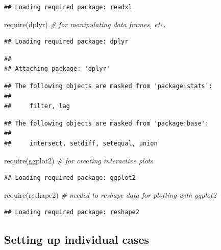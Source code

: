 \documentclass[
]{article}
\newenvironment{Shaded}{\begin{snugshade}}{\end{snugshade}}
\newcommand{\CommentTok}[1]{\textcolor[rgb]{0.56,0.35,0.01}{\textit{#1}}}
\newcommand{\FunctionTok}[1]{\textcolor[rgb]{0.00,0.00,0.00}{#1}}
\newcommand{\NormalTok}[1]{#1}
\begin{document}
\begin{verbatim}
## Loading required package: readxl
\end{verbatim}

\begin{Shaded}
\begin{Highlighting}[]
\FunctionTok{require}\NormalTok{(dplyr)    }\CommentTok{\# for manipulating data frames, etc. }
\end{Highlighting}
\end{Shaded}

\begin{verbatim}
## Loading required package: dplyr
\end{verbatim}

\begin{verbatim}
## 
## Attaching package: 'dplyr'
\end{verbatim}

\begin{verbatim}
## The following objects are masked from 'package:stats':
## 
##     filter, lag
\end{verbatim}

\begin{verbatim}
## The following objects are masked from 'package:base':
## 
##     intersect, setdiff, setequal, union
\end{verbatim}

\begin{Shaded}
\begin{Highlighting}[]
\FunctionTok{require}\NormalTok{(ggplot2)  }\CommentTok{\# for creating interactive plots }
\end{Highlighting}
\end{Shaded}

\begin{verbatim}
## Loading required package: ggplot2
\end{verbatim}

\begin{Shaded}
\begin{Highlighting}[]
\FunctionTok{require}\NormalTok{(reshape2) }\CommentTok{\# needed to reshape data for plotting with ggplot2}
\end{Highlighting}
\end{Shaded}

\begin{verbatim}
## Loading required package: reshape2
\end{verbatim}

\hypertarget{setting-up-individual-cases}{%
\subsection{Setting up individual
cases}\label{setting-up-individual-cases}}
\end{document}
